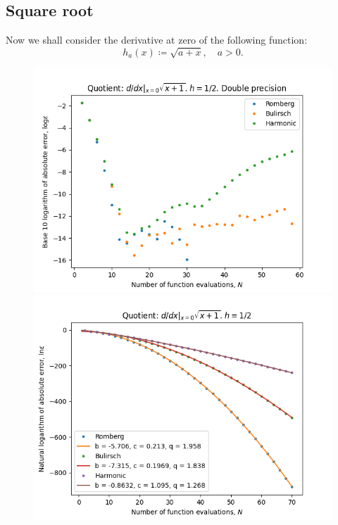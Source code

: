 \subsection{Square root}

Now we shall consider the derivative at zero of the following function:
\[
h_a(x) \coloneqq \sqrt{a + x}, \quad a > 0.
\]

\begin{figure}[H]
\centering
\begin{minipage}{0.45\textwidth}
\centering
\includegraphics[scale=0.45]{diff_quot_plots/sqrt_1.png}
\end{minipage}
\begin{minipage}{0.45\textwidth}
\centering
\includegraphics[scale=0.45]{diff_quot_plots/sqrt_1_hp_trend.png}
\end{minipage}
\end{figure}

